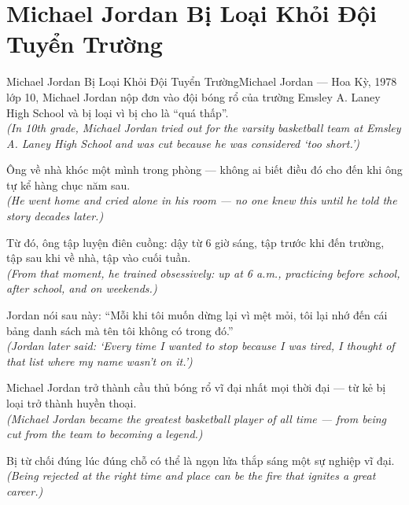 \section{Michael Jordan Bị Loại Khỏi Đội Tuyển Trường}
\begin{truyen}{Michael Jordan Bị Loại Khỏi Đội Tuyển Trường}{Michael Jordan --- Hoa Kỳ, 1978}
 lớp 10, Michael Jordan nộp đơn vào đội bóng rổ của trường Emsley A. Laney High School và bị loại vì bị cho là ``quá thấp''.\\[4pt]
\textit{(In 10th grade, Michael Jordan tried out for the varsity basketball team at Emsley A. Laney High School and was cut because he was considered `too short.')}

Ông về nhà khóc một mình trong phòng --- không ai biết điều đó cho đến khi ông tự kể hàng chục năm sau.\\[4pt]
\textit{(He went home and cried alone in his room --- no one knew this until he told the story decades later.)}

Từ đó, ông tập luyện điên cuồng: dậy từ 6 giờ sáng, tập trước khi đến trường, tập sau khi về nhà, tập vào cuối tuần.\\[4pt]
\textit{(From that moment, he trained obsessively: up at 6 a.m., practicing before school, after school, and on weekends.)}

Jordan nói sau này: ``Mỗi khi tôi muốn dừng lại vì mệt mỏi, tôi lại nhớ đến cái bảng danh sách mà tên tôi không có trong đó.''\\[4pt]
\textit{(Jordan later said: `Every time I wanted to stop because I was tired, I thought of that list where my name wasn't on it.')}

Michael Jordan trở thành cầu thủ bóng rổ vĩ đại nhất mọi thời đại --- từ kẻ bị loại trở thành huyền thoại.\\[4pt]
\textit{(Michael Jordan became the greatest basketball player of all time --- from being cut from the team to becoming a legend.)}

\end{truyen}
\begin{baihoc}
  Bị từ chối đúng lúc đúng chỗ có thể là ngọn lửa thắp sáng một sự nghiệp vĩ đại.\\[4pt]
  \textit{(Being rejected at the right time and place can be the fire that ignites a great career.)}
\end{baihoc}

